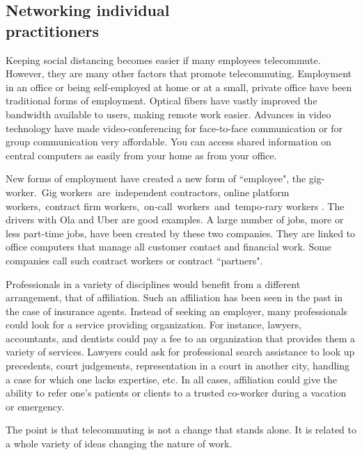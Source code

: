 \begin{multicols}{2}
\vspace{-.3cm}

\section{Networking individual\\ practitioners}\label{section-2}

\vspace{-.2cm}

Keeping social distancing becomes easier if many employees telecommute. However, they are many other factors that promote telecommuting. Employment in an office or being self-employed at home or at a small, private office have been traditional forms of employment. Optical fibers have vastly improved the bandwidth available to users, making remote work easier. Advances in video technology have made video-conferencing for face-to-face communication or for group communication very affordable. You can access shared information on central computers as easily from your home as from your office.

New forms of employment have created a new form of ``employee", the gig-worker.~Gig workers are independent contractors, online platform workers, contract firm workers, on-call workers and tempo-\break rary workers \cite{art3-key02}. The drivers with Ola and Uber are good examples. A large number of jobs, more or less part-time jobs, have been created by these two companies. They are linked to office computers that manage all customer contact and financial work. Some companies call such contract workers or contract ``partners".

Professionals in a variety of disciplines would benefit from a different arrangement, that of affiliation. Such an affiliation has been seen in the past in the case of insurance agents. Instead of seeking an employer, many professionals could look for a service providing organization. For instance, lawyers, accountants, and dentists could pay a fee to an organization that provides them a variety of services. Lawyers could ask for professional search assistance to look up precedents, court judgements, representation in a court in another city, handling a case for which one lacks expertise, etc. In all cases, affiliation could give the ability to refer one’s patients or clients to a trusted co-worker during a vacation or emergency.

The point is that telecommuting is not a change that stands alone. It is related to a whole variety of ideas changing the nature of work. 


\end{multicols}
